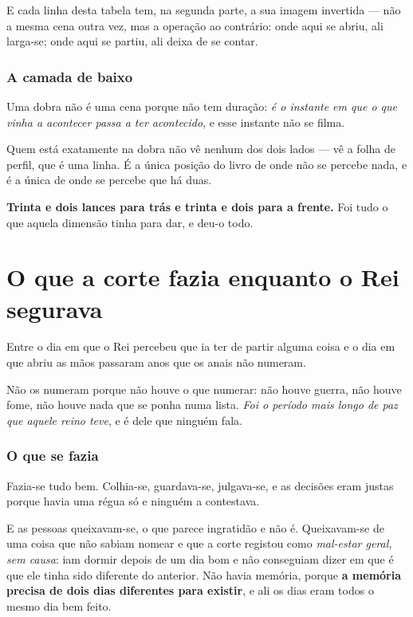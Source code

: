 \documentclass[livro.tex]{subfiles}
\begin{document}
\noindent E cada linha desta tabela tem, na segunda parte, a sua imagem invertida --- não a mesma
cena outra vez, mas a operação ao contrário: onde aqui se abriu, ali larga-se; onde aqui se
partiu, ali deixa de se contar.

\subsection*{A camada de baixo}

Uma dobra não é uma cena porque não tem duração: \emph{é o instante em que o que vinha a acontecer
passa a ter acontecido}, e esse instante não se filma.

\medskip

Quem está exatamente na dobra não vê nenhum dos dois lados --- vê a folha de perfil, que é uma
linha. É a única posição do livro de onde não se percebe nada, e é a única de onde se percebe que
há duas.

\medskip

\textbf{Trinta e dois lances para trás e trinta e dois para a frente.} Foi tudo o que aquela
dimensão tinha para dar, e deu-o todo.


\chapter{O que a corte fazia enquanto o Rei segurava}

Entre o dia em que o Rei percebeu que ia ter de partir alguma coisa e o dia em que abriu as mãos
passaram anos que os anais não numeram.

\medskip

Não os numeram porque não houve o que numerar: não houve guerra, não houve fome, não houve nada
que se ponha numa lista. \emph{Foi o período mais longo de paz que aquele reino teve}, e é dele
que ninguém fala.

\subsection*{O que se fazia}

Fazia-se tudo bem. Colhia-se, guardava-se, julgava-se, e as decisões eram justas porque havia uma
régua só e ninguém a contestava.

\medskip

E as pessoas queixavam-se, o que parece ingratidão e não é. Queixavam-se de uma coisa que não
sabiam nomear e que a corte registou como \emph{mal-estar geral, sem causa}: iam dormir depois de
um dia bom e não conseguiam dizer em que é que ele tinha sido diferente do anterior. Não havia
memória, porque \textbf{a memória precisa de dois dias diferentes para existir}, e ali os dias
eram todos o mesmo dia bem feito.
\end{document}
